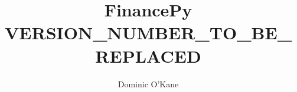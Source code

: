 \documentclass[twoside,11pt]{book}
\begin{document}
\title{{\Huge \bf FinancePy VERSION_NUMBER_TO_BE_REPLACED}}
\author{Dominic O'Kane}

\maketitle 

\cleardoublepage

\setcounter{tocdepth}{1}
\tableofcontents

\setcounter{page}{1}
\end{document}
